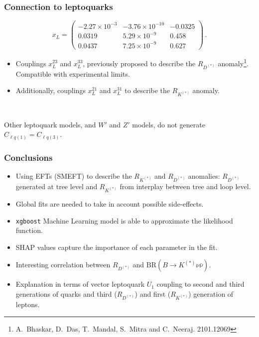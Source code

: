 \documentclass[mathserif, 10pt]{beamer}
\begin{document}
\begin{frame}
    \frametitle{Connection to leptoquarks}

    $$x_L = \begin{pmatrix}
        -2.27\times10^{-3} & -3.76\times 10^{-10}  & -0.0325 \\
        0.0319 & 5.29\times 10^{-9} &  0.458\\
        0.0437  & 7.25\times 10^{-9}  & 0.627
        \end{pmatrix}\,.
    $$
    \begin{itemize}
        \item Couplings $x_L^{23}$ and $x_L^{33}$, previously proposed to describe the $R_{D^{(*)}}$ anomaly\footnote[1]{A.~Bhaskar, D.~Das, T.~Mandal, S.~Mitra and C.~Neeraj. 2101.12069}. Compatible with experimental limits.
        \item Additionally, couplings $x_L^{21}$ and $x_L^{31}$ to describe the $R_{K^{(*)}}$ anomaly. 
    \end{itemize}

    ~
    
    Other leptoquark models, and $W'$ and $Z'$ models, do not generate $C_{\ell q(1)} = C_{\ell q (3)}$. 
\end{frame}

\begin{frame}
    \frametitle{Conclusions}

    \begin{itemize}
        \item Using EFTs (SMEFT) to describe the $R_{K^{(*)}}$ and $R_{D^{(*)}}$ anomalies: $R_{D^{(*)}}$ generated at tree level and $R_{K^{(*)}}$ from interplay between tree and loop level.
        \item Global fits are needed to take in account possible side-effects. 
        \item \texttt{xgboost} Machine Learning model is able to approximate the likelihood function.
        \item SHAP values capture the importance of each parameter in the fit.
        \item Interesting correlation between $R_{D^{(*)}}$ and $\mathrm{BR}(B\to K^{(*)}\nu\bar{\nu})$.
        \item Explanation in terms of vector leptoquark $U_1$ coupling to second and third generations of quarks and third ($R_{D^{(*)}}$) and first ($R_{K^{(*)}}$) generation of leptons.
    \end{itemize}

\end{frame}
\end{document}
